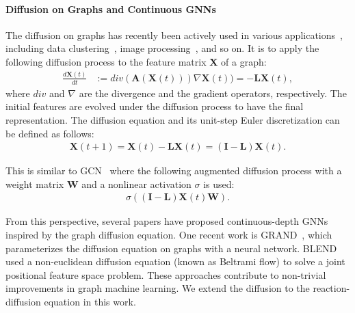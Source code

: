 \documentclass{article}
\theoremstyle{plain}
\theoremstyle{definition}
\theoremstyle{remark}
\begin{document}
\paragraph{Diffusion on Graphs and Continuous GNNs}



The diffusion on graphs has recently been actively used in various applications~\cite{freidlin1993diffusion,freidlin2000diffusion}, including data clustering~\cite{belkin2003laplacian,coifman2005geometric}, image processing~\cite{desquesnes2013eikonal,elmoataz2008nonlocal,gilboa2009nonlocal}, and so on. It is to apply the following diffusion process to the feature matrix $\mathbf{X}$ of a graph:
\begin{align}
\frac{d\mathbf{X}(t)}{dt} &:= div (\mathbf{A}(\mathbf{X}(t))) \nabla \mathbf{X}(t)) = -\mathbf{L}\mathbf{X}(t), \label{eq:heat_matrix}
\end{align}where $div$ and $\nabla$ are the divergence and the gradient operators, respectively. The initial features are evolved under the diffusion process to have the final representation. The diffusion equation and its unit-step Euler discretization can be defined as follows:
\begin{align}
    \mathbf{X}(t+1) = \mathbf{X}(t)-\mathbf{L}\mathbf{X}(t) = (\mathbf{I}-\mathbf{L})\mathbf{X}(t).\label{eq:euler_disc}
\end{align}

This is similar to GCN~\cite{kipf2017GCN} where the following augmented diffusion process with a weight matrix $\mathbf{W}$ and a nonlinear activation $\sigma$ is used:
\begin{align}
\sigma((\mathbf{I}-\mathbf{L})\mathbf{X}(t)\mathbf{W}).\label{eq:gcn-diffusion}
\end{align}

From this perspective, several papers have proposed continuous-depth GNNs~\cite{wang2021dgc,choi2021ltocf,hwang2021climate,thorpe2022grands,choi2023climate} inspired by the graph diffusion equation. One recent work is GRAND~\cite{chamberlain2021grand}, which parameterizes the diffusion equation on graphs with a neural network. BLEND~\cite{chamberlain2021blend} used a non-euclidean diffusion equation (known as Beltrami flow) to solve a joint positional feature space problem. These approaches contribute to non-trivial improvements in graph machine learning. We extend the diffusion to the reaction-diffusion equation in this work.
\end{document}

